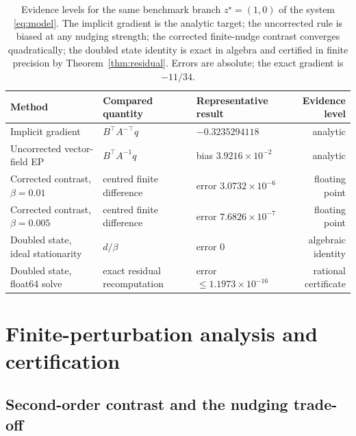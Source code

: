 \documentclass[11pt]{article}
\theoremstyle{definition}
\theoremstyle{remark}
\begin{document}
\begin{table}[t]
\centering
\small
\caption{Evidence levels for the same benchmark branch $z^\star = (1,0)$ of the system
\eqref{eq:model}. The implicit gradient is the analytic target; the uncorrected rule is biased at
any nudging strength; the corrected finite-nudge contrast converges quadratically; the doubled
state identity is exact in algebra and certified in finite precision by
Theorem~\ref{thm:residual}. Errors are absolute; the exact gradient is $-11/34$.}
\label{tab:levels}
\begin{tabular}{lllr}
\toprule
Method & Compared quantity & Representative result & Evidence level \\
\midrule
Implicit gradient & $B^{\top}A^{-\top}q$ & $-0.3235294118$ & analytic \\
Uncorrected vector-field EP & $B^{\top}A^{-1}q$ & bias $3.9216\times10^{-2}$ & analytic \\
Corrected contrast, $\beta = 0.01$ & centred finite difference & error $3.0732\times10^{-6}$ & floating point \\
Corrected contrast, $\beta = 0.005$ & centred finite difference & error $7.6826\times10^{-7}$ & floating point \\
Doubled state, ideal stationarity & $d/\beta$ & error $0$ & algebraic identity \\
Doubled state, float64 solve & exact residual recomputation & error $\le 1.1973\times10^{-16}$ & rational certificate \\
\bottomrule
\end{tabular}
\end{table}

\section{Finite-perturbation analysis and certification}\label{sec:budget}

\subsection{Second-order contrast and the nudging trade-off}
\end{document}
